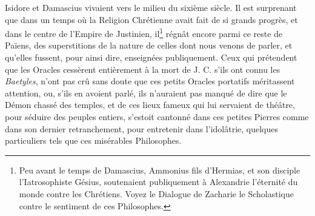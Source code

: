 \documentclass[a4paper, 11pt, oneside, polutonikogreek, french]{article}
\begin{document}
Isidore et Damascius vivaient vers le milieu du sixième siècle. Il est surprenant que dans un temps où la Religion Chrétienne avait fait de si grands progrès, et dans le centre de l'Empire de Justinien, il\footnote{Peu avant le temps de Damascius, Ammonius fils d'Hermias, et son disciple l'Iatrosophiste Gésius, soutenaient publiquement à Alexandrie l'éternité du monde contre les Chrétiens. Voyez le Dialogue de Zacharie le Scholastique contre le sentiment de ces Philosophes.} régnât encore parmi ce reste de Païens, des superstitions de la nature de celles dont nous venons de parler, et qu'elles fussent, pour ainsi dire, enseignées publiquement. Ceux qui prétendent que les Oracles cessèrent entièrement à la mort de J. C. s'ils ont connu les \emph{Baetyles}, n'ont pas crû sans doute que ces petits Oracles portatifs méritassent attention, ou, s'ils en avoient parlé, ils n'auraient pas manqué de dire que le Démon chassé des temples, et de ces lieux fameux qui lui servaient de théâtre, pour séduire des peuples entiers, s'estoit cantonné dans ces petites Pierres comme dans son dernier retranchement, pour entretenir dans l'idolâtrie, quelques particuliers tels que ces misérables Philosophes.
\end{document}
